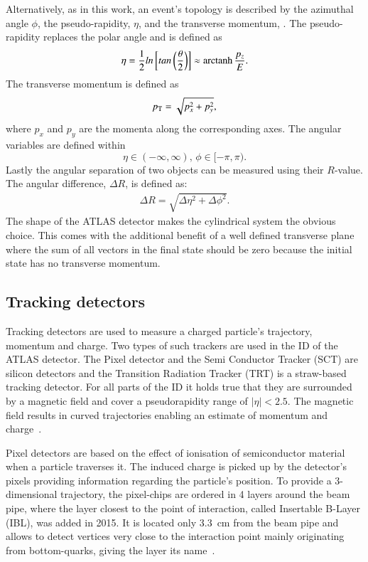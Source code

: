 Alternatively, as in this work, an event's topology is described by the azimuthal angle $\phi$, the pseudo-rapidity, $\eta$, and the transverse momentum, \pT. The pseudo-rapidity replaces the polar angle and is defined as
%
\begin{equation}
\eta = \frac{1}{2} ln\left[ tan\left(\frac{\theta}{2}\right)\right] \approx \operatorname{arctanh}\frac{p_z}{E}.
\end{equation}
%
The transverse momentum is defined as
%
\begin{equation}
p_{\text{T}} = \sqrt{p_x^2 + p_y^2},
\end{equation}
where $p_x$ and $p_y$ are the momenta along the corresponding axes. 
%
The angular variables are defined within
%
\begin{equation}
\eta \in (-\infty,\infty),\,
\phi \in [-\pi,\pi).
\end{equation}
%
Lastly the angular separation of two objects can be measured using their $R$-value. The angular difference, $\Delta R$, is defined as:
\begin{align}
\Delta R = \sqrt{\Delta \eta^2 + \Delta \phi^2}.
\end{align}
%
The shape of the ATLAS detector makes the cylindrical system the obvious choice. This comes with the additional benefit of a well defined transverse plane where the sum of all vectors in the final state should be zero because the initial state has no transverse momentum.



\subsection{Tracking detectors}

Tracking detectors are used to measure a charged particle's trajectory, momentum and charge. Two types of such trackers are used in the ID of the ATLAS detector. The Pixel detector and the Semi Conductor Tracker (SCT) are silicon detectors and the Transition Radiation Tracker (TRT) is a straw-based tracking detector. For all parts of the ID it holds true that they are surrounded by a magnetic field and cover a pseudorapidity range of $|\eta| < 2.5$. The magnetic field results in curved trajectories enabling an estimate of momentum and charge~\cite{leo}.

Pixel detectors are based on the effect of ionisation of semiconductor material when a particle traverses it. The induced charge is picked up by the detector's pixels providing information regarding the particle's position. To provide a 3-dimensional trajectory, the pixel-chips are ordered in 4 layers around the beam pipe, where the layer closest to the point of interaction, called Insertable B-Layer (IBL), was added in 2015. It is located only \SI{3.3}{\centi \metre} from the beam pipe and allows to detect vertices very close to the interaction point mainly originating from bottom-quarks, giving the layer its name~\cite{pixel_run2}.

